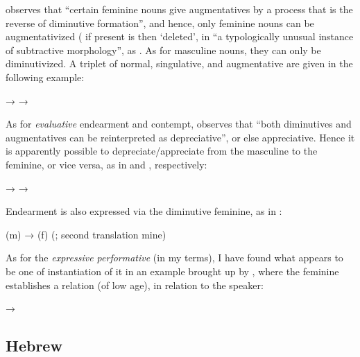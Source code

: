 \citet{AbdelMassih1971} observes that ``certain feminine nouns give
augmentatives by a process that is the reverse of diminutive formation'', and
hence, only feminine nouns can be augmentativized ( if present is then
`deleted', in ``a typologically unusual instance of subtractive morphology'',
as \textcite[10]{Grandi2015}. As for masculine nouns, they can only be
diminutivized. A triplet of normal, singulative, and augmentative are given in
the following example:

\begin{exe}
  \ex\label{ex:fassi:57}  →  → 
\end{exe}

As for \textit{evaluative} endearment and contempt, \citet[219]{Mettouchi1999}
observes that ``both diminutives and augmentatives can be reinterpreted as
depreciative'', or else appreciative. Hence it is apparently possible to
depreciate/appreciate from the masculine to the feminine, or vice versa, as in
 and , respectively:

\begin{exe}
  \ex\label{ex:fassi:58}  → 
  \ex\label{ex:fassi:59}  → 
\end{exe}

Endearment is also expressed via the diminutive feminine, as in
:

\begin{exe}
  \ex\label{ex:fassi:60}  (m)  →  (f)  (\citealt{Kossmann2014}; second translation mine)
\end{exe}

As for the \textit{expressive performative} (in my terms), I have found what
appears to be one of instantiation of it in an example brought up by
\citet{Kossmann2014}, where the feminine establishes a relation (of low age),
in relation to the speaker:

\begin{exe}
  \ex\label{ex:fassi:61}  → 
\end{exe}

\subsection{Hebrew}


